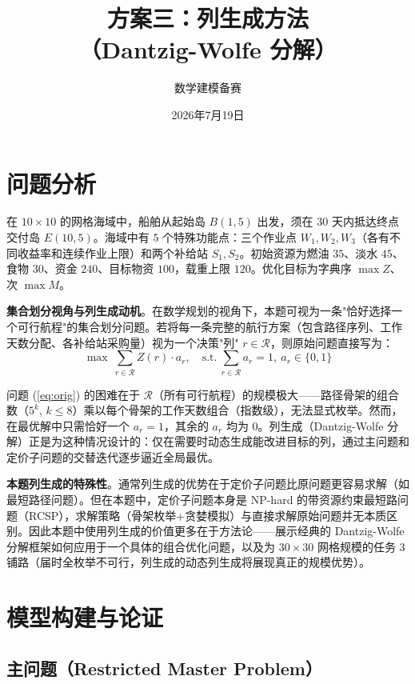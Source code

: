 \documentclass[12pt,a4paper]{ctexart}
\title{\textbf{方案三：列生成方法\\（Dantzig-Wolfe 分解）}}
\author{数学建模备赛}
\date{2026年7月19日}
\theoremstyle{definition}
\begin{document}
\maketitle

\section{问题分析}

在 $10\times 10$ 的网格海域中，船舶从起始岛 $B(1,5)$ 出发，须在 $30$ 天内抵达终点交付岛 $E(10,5)$。海域中有 $5$ 个特殊功能点：三个作业点 $W_1,W_2,W_3$（各有不同收益率和连续作业上限）和两个补给站 $S_1,S_2$。初始资源为燃油 $35$、淡水 $45$、食物 $30$、资金 $240$、目标物资 $100$，载重上限 $120$。优化目标为字典序 $\max Z$、次 $\max M$。

\textbf{集合划分视角与列生成动机}。在数学规划的视角下，本题可视为一条"恰好选择一个可行航程"的集合划分问题。若将每一条完整的航行方案（包含路径序列、工作天数分配、各补给站采购量）视为一个决策"列" $r\in\mathcal{R}$，则原始问题直接写为：
\begin{equation}\label{eq:orig}
  \max\ \sum_{r\in\mathcal{R}} Z(r)\cdot a_r,\quad \text{s.t.}\ \sum_{r\in\mathcal{R}} a_r = 1,\ a_r\in\{0,1\}
\end{equation}

问题 (\ref{eq:orig}) 的困难在于 $\mathcal{R}$（所有可行航程）的规模极大——路径骨架的组合数（$5^k$, $k\le 8$）乘以每个骨架的工作天数组合（指数级），无法显式枚举。然而，在最优解中只需恰好一个 $a_r=1$，其余的 $a_r$ 均为 0。列生成（Dantzig-Wolfe 分解）正是为这种情况设计的：仅在需要时动态生成能改进目标的列，通过主问题和定价子问题的交替迭代逐步逼近全局最优。

\textbf{本题列生成的特殊性}。通常列生成的优势在于定价子问题比原问题更容易求解（如最短路径问题）。但在本题中，定价子问题本身是 NP-hard 的带资源约束最短路问题（RCSP），求解策略（骨架枚举+贪婪模拟）与直接求解原始问题并无本质区别。因此本题中使用列生成的价值更多在于方法论——展示经典的 Dantzig-Wolfe 分解框架如何应用于一个具体的组合优化问题，以及为 $30\times 30$ 网格规模的任务 3 铺路（届时全枚举不可行，列生成的动态列生成将展现真正的规模优势）。

\section{模型构建与论证}

\subsection{主问题（Restricted Master Problem）}
\end{document}
